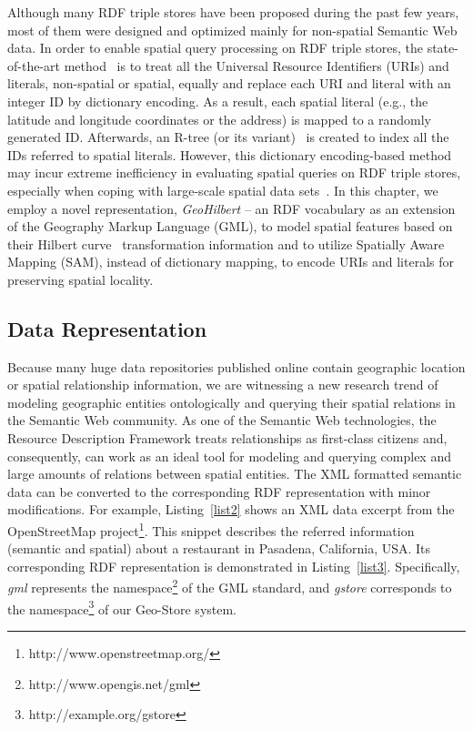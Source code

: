 Although many RDF triple stores have been proposed during the past few years, most of them were designed and optimized mainly for non-spatial Semantic Web data. In order to enable spatial query processing on RDF triple stores, the state-of-the-art method~\cite{conf/gis/BrodtNM10} is to treat all the Universal Resource Identifiers (URIs) and literals, non-spatial or spatial, equally and replace each URI and literal with an integer ID by dictionary encoding. As a result, each spatial literal (e.g., the latitude and longitude coordinates or the address) is mapped to a randomly generated ID. Afterwards, an R-tree (or its variant)~\cite{reference/gis/HadjieleftheriouMTT08} is created to index all the IDs referred to spatial literals. However, this dictionary encoding-based method may incur extreme inefficiency in evaluating spatial queries on RDF triple stores, especially when coping with large-scale spatial data sets~\cite{conf/gis/BrodtNM10}. In this chapter, we employ a novel representation, \emph{GeoHilbert} -- an RDF vocabulary as an extension of the Geography Markup Language (GML), to model spatial features based on their Hilbert curve~\cite{journals/tkde/MoonJFS01} transformation information and to utilize Spatially Aware Mapping (SAM), instead of dictionary mapping, to encode URIs and literals for preserving spatial locality.

\subsection{Data Representation}

Because many huge data repositories published online contain geographic location or spatial relationship information, we are witnessing a new research trend of modeling geographic entities ontologically and querying their spatial relations in the Semantic Web community. As one of the Semantic Web technologies, the Resource Description Framework treats relationships as first-class citizens and, consequently, can work as an ideal tool for modeling and querying complex and large amounts of relations between spatial entities. The XML formatted semantic data can be converted to the corresponding RDF representation with minor modifications. For example, Listing~\ref{list2} shows an XML data excerpt from the OpenStreetMap project\footnote{http://www.openstreetmap.org/}. This snippet describes the referred information (semantic and spatial) about a restaurant in Pasadena, California, USA. Its corresponding RDF representation is demonstrated in Listing~\ref{list3}. Specifically, \emph{gml} represents the namespace\footnote{http://www.opengis.net/gml} of the GML standard, and \emph{gstore} corresponds to the namespace\footnote{http://example.org/gstore} of our Geo-Store system.

